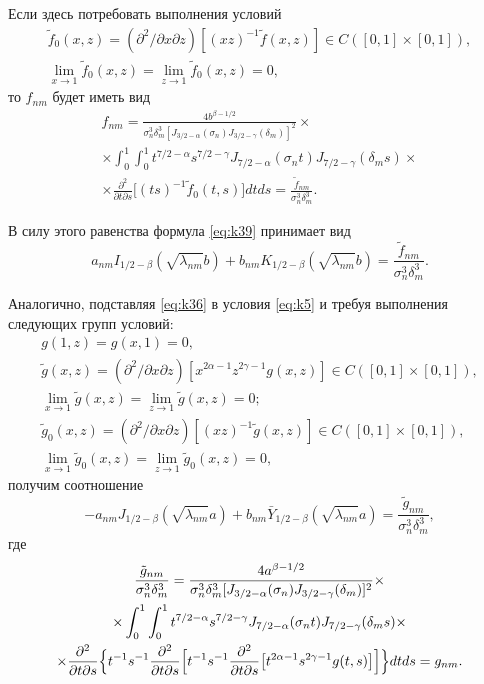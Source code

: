 Если здесь потребовать выполнения условий
\begin{equation}
\begin{array}{c}
\tilde f_0(x,z)=(\partial^2/\partial x\partial z)[(xz)^{-1}\tilde f(x,z)]\in C([0,1]\times[0,1]), 
\\
\lim\limits_{x\to1}\tilde f_0(x,z)=\lim\limits_{z\to1}\tilde f_0(x,z)=0, 
\end{array} 
\label{eq:k44}
\end{equation}
то $f_{nm} $ будет иметь вид
\begin{multline*}
f_{nm}=\frac{4b^{\beta- 1/2 }}{\sigma_n^3\delta_m^3[J_{3/2-\alpha}(\sigma_n)J_{3/2-\gamma}(\delta_m)]^2}\times
\\
\times\int_0^1{\int_0^1{t^{7/2-\alpha}s^{7/2-\gamma}J_{7/2-\alpha}(\sigma_n t)J_{7/2-\gamma}(\delta_m s)\times}}
\\
\times\frac{\partial^2}{\partial t\partial s} \bigl[(ts)^{-1}\tilde f_0(t,s)\bigr]dtds=\frac{\tilde f_{nm}}{\sigma_n^3\delta_m^3}.
\end{multline*}

	В силу этого равенства формула \eqref{eq:k39} принимает вид
\begin{equation}
a_{nm}I_{ 1/2 -\beta}(\sqrt{\lambda_{nm}}b)+b_{nm}K_{ 1/2 -\beta}(\sqrt{\lambda_{nm}}b)=\frac{\tilde f_{nm}}{\sigma_n^3\delta_m^3}.
\label{eq:k45}
\end{equation}

	Аналогично, подставляя \eqref{eq:k36} в условия \eqref{eq:k5} и требуя выполнения следующих групп условий:
\begin{equation}
\begin{array}{c}
g(1,z)=g(x,1)=0, 
\\
\tilde g(x,z)=(\partial^2/\partial x\partial z)[x^{2\alpha-1}z^{2\gamma-1}g(x,z)]\in C([0,1]\times[0,1]),
\\
\lim\limits_{x\to1}\tilde g(x,z)=\lim\limits_{z\to1}\tilde g(x,z)=0;
 \\[4mm]
\tilde g_0(x,z)=(\partial^2/\partial x\partial z)[(xz)^{-1}\tilde g(x,z)]\in C([0,1]\times[0,1]),
\\
\lim\limits_{x\to1}\tilde g_0(x,z)=\lim\limits_{z\to1}\tilde g_0(x,z)=0, 
 \end{array} 
\label{eq:k46}
\end{equation}
получим соотношение
\begin{equation}
-a_{nm}J_{ 1/2 -\beta}(\sqrt{\lambda_{nm}}a)+b_{nm}\bar Y_{ 1/2 -\beta}(\sqrt{\lambda_{nm}}a)=\frac{\tilde g_{nm}}{\sigma_n^3 \delta_m^3},
\label{eq:k47}
\end{equation}
где
\begin{multline*}
\frac{\tilde g_{nm}}{\sigma_n^3\delta_m^3}=\frac{4a^{\beta- 1/2 }}{\sigma_n^3\delta_m^3[J_{3/2-\alpha}(\sigma_n)J_{3/2-\gamma}(\delta_m)]^2}\times
\\
\times\int_0^1{\int_0^1{t^{7/2-\alpha}s^{7/2-\gamma}J_{7/2-\alpha}(\sigma_n t)J_{7/2-\gamma}(\delta_m s)}}\times
\\
\times\frac{\partial^2}{\partial t\partial s}
\Bigl\{ 
t^{-1}s^{-1}\frac{\partial^2}{\partial t\partial s}
\Bigl[t^{-1}s^{-1}\frac{\partial^2}{\partial t\partial s}\bigl[t^{2\alpha-1}s^{2\gamma-1}g(t,s)\bigr]\Bigr]\Bigr\}dtds=g_{nm}.
\end{multline*}

